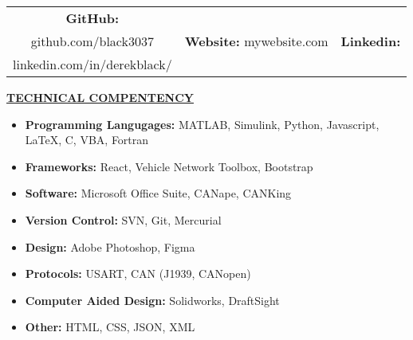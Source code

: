 \documentclass[8pt,letterpaper,oneside]{article}
\newcommand{\longunderline}[1]{\uline{#1\hfill\mbox{}}}
\newcommand{\sectionhead}[1]{ \large \flushleft \longunderline{\textbf{#1}}} %
\begin{document}
    \begin{center}
        \begin{tabular}{ c c c }
            \textbf{GitHub:} \href{https:\\github.com/black3037}{github.com/black3037} & \textbf{Website:} mywebsite.com & \textbf{Linkedin:} \href{https:\\linkedin.com/in/derekblack/}{linkedin.com/in/derekblack/}
        \end{tabular}
    \end{center}

    \sectionhead{TECHNICAL COMPENTENCY}
        \begin{sectionitems}
            \begin{itemize}
                \setlength\itemsep{0.1em}
                \setlength{\itemindent}{-0.4em}
                \item \textbf{Programming Langugages:} MATLAB, Simulink, Python, Javascript, \LaTeX, C, VBA, Fortran
                \item \textbf{Frameworks:} React, Vehicle Network Toolbox, Bootstrap
                \item \textbf{Software:} Microsoft Office Suite, CANape, CANKing
                \item \textbf{Version Control:} SVN, Git, Mercurial
                \item \textbf{Design:} Adobe Photoshop, Figma
                \item \textbf{Protocols:} USART, CAN (J1939, CANopen)
                \item \textbf{Computer Aided Design:} Solidworks, DraftSight
                \item \textbf{Other:} HTML, CSS, JSON, XML
            \end{itemize}
        \end{sectionitems}
\end{document}
